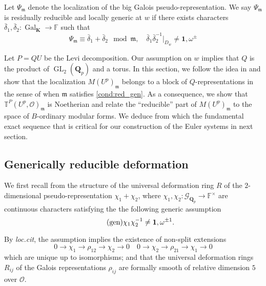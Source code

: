 \documentclass[leqno]{amsart}
\newcommand{\fF}{\mathbb{F}} %
\newcommand{\TT}{\mathbb{T}} %
\newcommand{\Gp}{\mathcal{G}_{\Qp}} %
\DeclareMathOperator{\Gal}{Gal}
\DeclareMathOperator{\GL}{GL}
\newcommand{\id}{\mathbf{1}}
\newcommand{\Qp}{\mathbf{Q}_p}
\newcommand{\K}{{\mathbf{K}}} %
\newcommand{\oo}{\mathcal{O}} %
\newcommand{\fm}{\mathfrak{m}}
\theoremstyle{definition}
\theoremstyle{remark}
\begin{document}
Let  $\Psi_{\fm}$ denote 
the localization of the big Galois pseudo-representation.
We say $\Psi_{\fm}$ is 
residually reducible and locally generic at $w$ if
there exists characters
$\bar{\delta}_1, \bar{\delta}_2\colon \Gal_{\K}\to \fF$
such that 
\begin{equation}\tag{red.gen}\label{cond:red_gen}
	\Psi_\fm\equiv \bar{\delta}_1+\bar{\delta}_2
	\mod \fm,\quad
	\bar{\delta}_1\bar{\delta}_2^{-1} \vert_{D_w}
	\neq \id,\omega^{\pm}
\end{equation}

Let $P=QU$ be the Levi decomposition.
Our assumption on $w$ implies that
$Q$ is the product of  $\GL_2(\Qp)$
and a torus.
In this section,
we follow the idea in \cite{urban}
and show that the localization
$M(U^p)_{\fm}$ belongs to a block
of $Q$-representations in the sense of  \cite{pask}
when  $\fm$ satisfies \eqref{cond:red_gen}.
As a consequence,
we show that $\TT^P(U^p,\oo)_{\fm}$
is Noetherian
and relate the ``reducible'' part of 
$M(U^p)_{\fm}$ to the space of 
$B$-ordinary modular forms.
We deduce from which
the fundamental exact sequence
that is critical for our
construction of the Euler systems
in next section.

\subsection{Generically reducible deformation}



We first recall from \cite[\S B.1]{pask}
the structure of the universal deformation ring 
$R$ of the $2$-dimensional pseudo-representation 
$\chi_1+\chi_2$,
where $\chi_1,\chi_2\colon \Gp\to \fF^\times$ 
are continuous characters satisfying the 
the following generic assumption
\begin{equation}\label{cond:generic}\tag{\text{gen}}
	\chi_1\chi_2^{-1}\neq \id,\omega^{\pm1}.
\end{equation}

By \textit{loc.cit}, the assumption
implies the existence of non-split extensions
\begin{equation*}
    0\to \chi_1\to \rho_{12}\to \chi_2\to 0\quad
    0\to \chi_2\to \rho_{21}\to \chi_1\to 0
\end{equation*}
which are unique up to isomorphisms;
and that the universal deformation rings
$R_{ij}$ of the Galois representations $\rho_{ij}$
are formally smooth of relative dimension $5$ over $\oo$.
\end{document}
